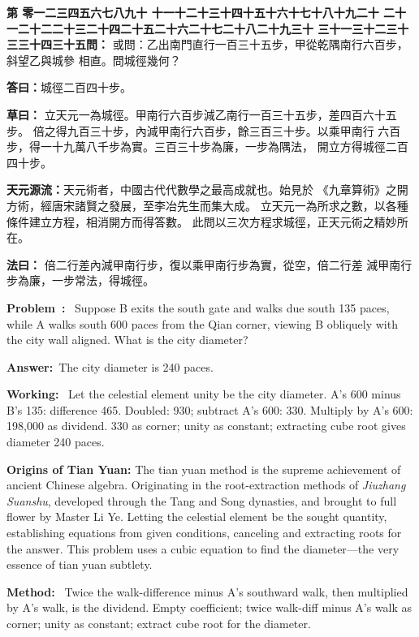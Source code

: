 \documentclass[9pt,a4paper]{article}
\newcounter{probnum}
\newcounter{overallnum}
\newcommand{\chnum}[1]{%
  \ifcase#1 零\or 一\or 二\or 三\or 四\or 五\or 六\or 七\or 八\or 九\or 十\or
    十一\or 十二\or 十三\or 十四\or 十五\or 十六\or 十七\or 十八\or 十九\or 二十\or
    二十一\or 二十二\or 二十三\or 二十四\or 二十五\or 二十六\or 二十七\or 二十八\or 二十九\or 三十\or
    三十一\or 三十二\or 三十三\or 三十四\or 三十五\fi}
\newcommand{\problem}[1]{\stepcounter{probnum}\stepcounter{overallnum}\par\noindent\textbf{\color{volcolor}第\chnum{\value{probnum}}問：}#1\par\vspace{0.15cm}}
\newcommand{\answer}[1]{\par\noindent\textbf{答曰：}#1\par\vspace{0.15cm}}
\newcommand{\working}[1]{\par\noindent\textbf{草曰：}#1\par\vspace{0.15cm}}
\newcommand{\method}[1]{\par\noindent\textbf{法曰：}#1\par\vspace{0.25cm}}
\newcommand{\eproblem}[1]{\par\noindent\textbf{\color{volcolor}Problem~\theoverallnum:}~#1\par\vspace{0.15cm}}
\newcommand{\eanswer}[1]{\par\noindent\textbf{Answer:}~#1\par\vspace{0.15cm}}
\newcommand{\eworking}[1]{\par\noindent\textbf{Working:}~#1\par\vspace{0.15cm}}
\newcommand{\emethod}[1]{\par\noindent\textbf{Method:}~#1\par\vspace{0.25cm}}
\begin{document}
\noindent\begin{minipage}[t]{0.48\textwidth}
\problem{
或問：乙出南門直行一百三十五步，甲從乾隅南行六百步，斜望乙與城參
相直。問城徑幾何？
}

\answer{城徑二百四十步。}

\working{
立天元一為城徑。甲南行六百步減乙南行一百三十五步，差四百六十五步。
倍之得九百三十步，內減甲南行六百步，餘三百三十步。以乘甲南行
六百步，得一十九萬八千步為實。三百三十步為廉，一步為隅法，
開立方得城徑二百四十步。

\textbf{天元源流：}天元術者，中國古代代數學之最高成就也。始見於
《九章算術》之開方術，經唐宋諸賢之發展，至李冶先生而集大成。
立天元一為所求之數，以各種條件建立方程，相消開方而得答數。
此問以三次方程求城徑，正天元術之精妙所在。
}

\method{
倍二行差內減甲南行步，復以乘甲南行步為實，從空，倍二行差
減甲南行步為廉，一步常法，得城徑。
}
\end{minipage}%
\hfill%
\begin{minipage}[t]{0.50\textwidth}
\eproblem{
Suppose B exits the south gate and walks due south 135 paces, while A walks
south 600 paces from the Qian corner, viewing B obliquely with the city wall
aligned. What is the city diameter?
}

\eanswer{The city diameter is 240 paces.}

\eworking{
Let the celestial element unity be the city diameter. A's 600 minus B's 135:
difference 465. Doubled: 930; subtract A's 600: 330. Multiply by A's 600:
198,000 as dividend. 330 as corner; unity as constant; extracting cube root
gives diameter 240 paces.

\textbf{Origins of Tian Yuan:} The tian yuan method is the supreme achievement
of ancient Chinese algebra. Originating in the root-extraction methods of
\textit{Jiuzhang Suanshu}, developed through the Tang and Song dynasties,
and brought to full flower by Master Li Ye. Letting the celestial element be
the sought quantity, establishing equations from given conditions, canceling
and extracting roots for the answer. This problem uses a cubic equation to
find the diameter---the very essence of tian yuan subtlety.
}

\emethod{
Twice the walk-difference minus A's southward walk, then multiplied by A's
walk, is the dividend. Empty coefficient; twice walk-diff minus A's walk as
corner; unity as constant; extract cube root for the diameter.
}
\end{minipage}
\vspace{0.15cm}
\end{document}
